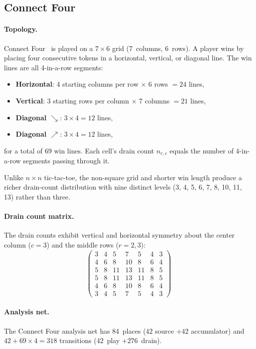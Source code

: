 \documentclass[11pt,a4paper]{article}
\begin{document}
\subsection{Connect Four}
\label{sec:connect4}

\paragraph{Topology.}
Connect Four~\cite{allis1988} is played on a $7 \times 6$ grid (7~columns, 6~rows).
A player wins by placing four consecutive tokens in a horizontal, vertical, or diagonal line.
The win lines are all 4-in-a-row segments:
\begin{itemize}
  \item \textbf{Horizontal}: 4 starting columns per row $\times$ 6 rows $= 24$ lines,
  \item \textbf{Vertical}: 3 starting rows per column $\times$ 7 columns $= 21$ lines,
  \item \textbf{Diagonal $\searrow$}: $3 \times 4 = 12$ lines,
  \item \textbf{Diagonal $\nearrow$}: $3 \times 4 = 12$ lines,
\end{itemize}
for a total of 69 win lines.
Each cell's drain count $n_{r,c}$ equals the number of 4-in-a-row segments passing through it.

Unlike $n \times n$ tic-tac-toe, the non-square grid and shorter win length produce a richer drain-count distribution with nine distinct levels (3, 4, 5, 6, 7, 8, 10, 11, 13) rather than three.

\paragraph{Drain count matrix.}
The drain counts exhibit vertical and horizontal symmetry about the center column ($c = 3$) and the middle rows ($r = 2, 3$):
\[
\begin{pmatrix}
3 & 4 & 5 & 7 & 5 & 4 & 3 \\
4 & 6 & 8 & 10 & 8 & 6 & 4 \\
5 & 8 & 11 & 13 & 11 & 8 & 5 \\
5 & 8 & 11 & 13 & 11 & 8 & 5 \\
4 & 6 & 8 & 10 & 8 & 6 & 4 \\
3 & 4 & 5 & 7 & 5 & 4 & 3
\end{pmatrix}
\]

\paragraph{Analysis net.}
The Connect Four analysis net has 84~places ($42$ source $+ 42$ accumulator) and $42 + 69 \times 4 = 318$ transitions ($42$~play $+ 276$~drain).
\end{document}
